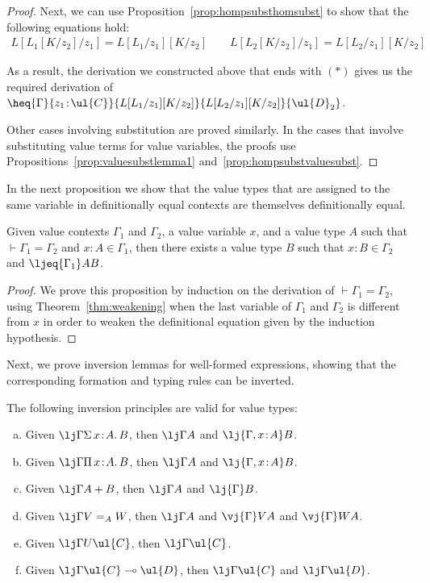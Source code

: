 \begin{proof}
Next, we can use Proposition~\ref{prop:hompsubsthomsubst} to show that the following equations hold: 
\[
\begin{array}{c}
L[L_1[K/z_2]/z_1] = L[L_1/z_1][K/z_2]
\qquad
L[L_2[K/z_2]/z_1] = L[L_2/z_1][K/z_2]
\end{array}
\]

As a result, the derivation we constructed above that ends with $(*)$ gives us the required derivation of 
$\heq {\Gamma} {z_1 \!:\! \ul{C}} {L[L_1/z_1][K/z_2]} {L[L_2/z_1][K/z_2]} {\ul{D}_2}$.

Other cases involving substitution are proved similarly. In the cases that involve substituting value terms for value variables, the proofs use Propositions~\ref{prop:valuesubstlemma1} and~\ref{prop:hompsubstvaluesubst}.
\end{proof}

In the next proposition we show that the value types that are assigned to the same variable in definitionally equal contexts are themselves definitionally equal.

\begin{proposition}
\label{prop:findingvariableinequalcontexts}
Given value contexts $\Gamma_1$ and $\Gamma_2$, a value variable $x$, and a value type $A$ such that $\vdash \Gamma_1 = \Gamma_2$ and $x \!:\! A \in \Gamma_1$, then there exists a value type $B$ such that $x \!:\! B \in \Gamma_2$ and $\ljeq {\Gamma_1} A B$.
\end{proposition}

\begin{proof}
We prove this proposition by induction on the derivation of $\vdash \Gamma_1 = \Gamma_2$, using Theorem~\ref{thm:weakening} when the last variable of $\Gamma_1$ and $\Gamma_2$ is different from $x$ in order to weaken the definitional equation given by the induction hypothesis.
\end{proof}

Next, we prove inversion lemmas for well-formed expressions, showing that the corresponding formation and typing rules can be inverted.


\begin{proposition} 
\label{prop:valuetypeinversion}
The following inversion principles are valid for value types:
\begin{enumerate}[(a)]
\item Given $\lj \Gamma {\Sigma\, x \!:\! A .\, B}$, then $\lj \Gamma A$ and $\lj {\Gamma, x \!:\! A} B$.
\item Given $\lj \Gamma {\Pi\, x \!:\! A .\, B}$, then $\lj \Gamma A$ and $\lj {\Gamma, x \!:\! A} B$.
\item Given $\lj \Gamma {A + B}$, then $\lj \Gamma A$ and $\lj {\Gamma} B$.
\item Given $\lj \Gamma {V =_A W}$, then $\lj \Gamma A$ and $\vj {\Gamma} V A$ and $\vj {\Gamma} W A$.
\item Given $\lj \Gamma {U\ul{C}}$, then $\lj \Gamma \ul{C}$.
\item Given $\lj \Gamma {\ul{C} \multimap \ul{D}}$, then $\lj \Gamma \ul{C}$ and $\lj \Gamma \ul{D}$.
\end{enumerate}
\end{proposition}

